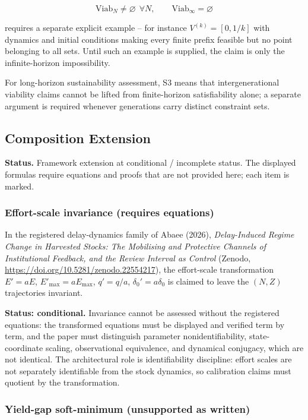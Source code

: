 \[\mathrm{Viab}_N \neq \varnothing \ \ \forall N, \qquad \mathrm{Viab}_\infty = \varnothing\]

requires a separate explicit example -- for instance $V^{(k)} = [0, 1/k]$ with dynamics and initial conditions making every finite prefix feasible but no point belonging to all sets. Until such an example is supplied, the claim is only the infinite-horizon impossibility.

For long-horizon sustainability assessment, S3 means that intergenerational viability claims cannot be lifted from finite-horizon satisfiability alone; a separate argument is required whenever generations carry distinct constraint sets.



\subsection{Composition Extension}

\textbf{Status.} Framework extension at conditional / incomplete status. The displayed formulas require equations and proofs that are not provided here; each item is marked.


\subsubsection{Effort-scale invariance (requires equations)}

In the registered delay-dynamics family of Abaee (2026), \emph{Delay-Induced Regime Change in Harvested Stocks: The Mobilising and Protective Channels of Institutional Feedback, and the Review Interval as Control} (Zenodo, \url{https://doi.org/10.5281/zenodo.22554217}), the effort-scale transformation $E' = aE$, $E'_{\max} = aE_{\max}$, $q' = q/a$, $\delta_0' = a\delta_0$ is claimed to leave the $(N, Z)$ trajectories invariant.

\textbf{Status: conditional.} Invariance cannot be assessed without the registered equations: the transformed equations must be displayed and verified term by term, and the paper must distinguish parameter nonidentifiability, state-coordinate scaling, observational equivalence, and dynamical conjugacy, which are not identical. The architectural role is identifiability discipline: effort scales are not separately identifiable from the stock dynamics, so calibration claims must quotient by the transformation.


\subsubsection{Yield-gap soft-minimum (unsupported as written)}

